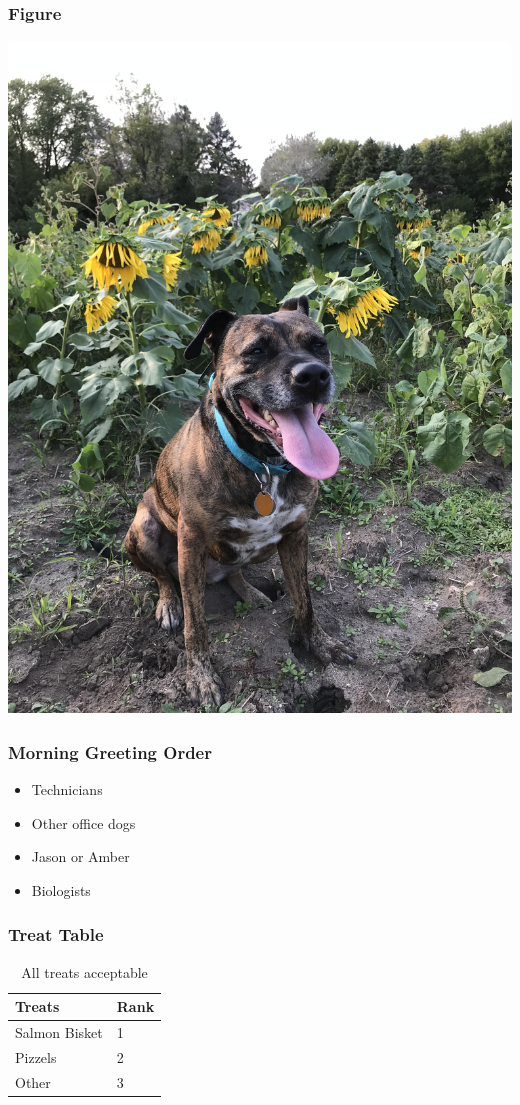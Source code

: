 \documentclass[12pt]{beamer}\usepackage[]{graphicx}\usepackage[]{color}
\begin{document}
\begin{frame}
\frametitle{Figure}
   \includegraphics[width=0.5\linewidth]{Macy.jpg}
   
\end{frame}


\begin{frame}
\frametitle{Morning Greeting Order}
\begin{itemize}
\item<1-> Technicians
\item<2-> Other office dogs
\item<3-> Jason or Amber
\item<4-> Biologists
\end{itemize}
\end{frame}



\begin{frame}
\frametitle{Treat Table}
\begin{table}
\begin{tabular}{l l}
\toprule
\textbf{Treats} & \textbf{Rank}\\
\midrule
Salmon Bisket & 1\\
Pizzels & 2 \\
Other & 3 \\
\bottomrule
\end{tabular}
\caption{All treats acceptable}
\end{table}
\end{frame}
\end{document}
